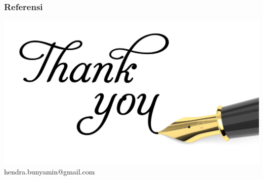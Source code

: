 \documentclass{beamer}
\theoremstyle{mystyle}
\begin{document}


%
\begin{frame}[allowframebreaks]
  \frametitle<presentation>{\textbf{Referensi}}
    {\footnotesize
    
    
    }    
\end{frame}



\begin{frame}[plain]
		\centering\includegraphics[scale=1]{thank-you}	
		hendra.bunyamin@gmail.com
\end{frame}
\end{document}
